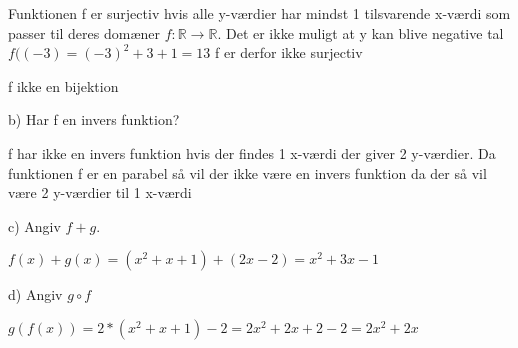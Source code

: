 \documentclass{article}
\begin{document}
Funktionen f er surjectiv hvis alle y-værdier har mindst 1 tilsvarende x-værdi som passer til deres domæner \(f : \mathbb{R} \rightarrow \mathbb{R}\). 
Det er ikke muligt at y kan blive negative tal
\(f((-3)=(-3)^2+3+1=13\)
f er derfor ikke surjectiv  


f ikke en bijektion



b) Har f en invers funktion?

f har ikke en invers funktion hvis der findes 1 x-værdi der giver 2 y-værdier.
Da funktionen f er en parabel så vil der ikke være en invers funktion da der så vil være 2 y-værdier til 1 x-værdi


c) Angiv \(f + g\).

\(f(x)+g(x)=(x^2+x+1)+(2x-2)=x^2+3x-1\)


d) Angiv \(g \circ f\) 


\(g(f(x))=2*(x^2+x+1)-2=2x^2+2x+2-2=2x^2+2x\)
\end{document}
